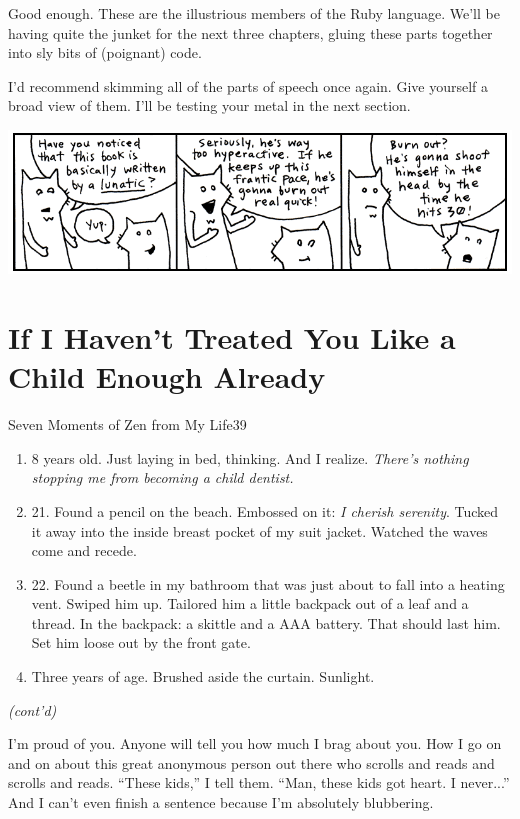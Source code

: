 \documentclass[10pt,twoside]{report}
\begin{document}
Good enough.  These are the illustrious members of the Ruby language.
We'll be having quite the junket for the next three chapters, gluing
these parts together into sly bits of (poignant) code.

I'd recommend skimming all of the parts of speech once again.  Give
yourself a broad view of them.  I'll be testing your metal in the next
section.

	\includegraphics[width=1.0\textwidth]{cache/16.png}


\section{If I Haven't Treated You Like a Child Enough Already}

	\begin{sidebar}{Seven Moments of Zen from My Life}{39}
		\begin{enumerate}
			\item 8 years old. Just laying in bed, thinking. And I realize. \textit{There's nothing stopping me from becoming a child dentist.}
			\item 21. Found a pencil on the beach. Embossed on it: \textit{I cherish serenity}. Tucked it away into the inside breast pocket of my suit jacket. Watched the waves come and recede.
			\item 22. Found a beetle in my bathroom that was just about to fall into a heating vent. Swiped him up. Tailored him a little backpack out of a leaf and a thread. In the backpack: a skittle and a AAA battery. That should last him. Set him loose out by the front gate.
			\item Three years of age. Brushed aside the curtain. Sunlight.
		\end{enumerate}
		\textit{(cont'd)}
	\end{sidebar}

I'm proud of you.  Anyone will tell you how much I brag about you.
How I go on and on about this great anonymous person out there who
scrolls and reads and scrolls and reads.  ``These kids,'' I tell them.
``Man, these kids got heart.  I never...''  And I can't even finish a
sentence because I'm absolutely blubbering.
\end{document}
